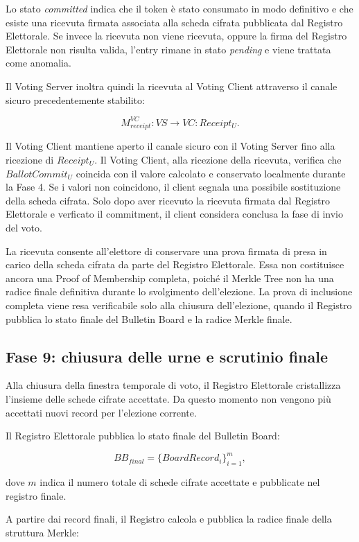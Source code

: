 \documentclass[a4paper,12pt]{article}
\begin{document}
Lo stato \emph{committed} indica che il token \`e stato consumato in modo definitivo e che esiste una ricevuta firmata associata alla scheda cifrata pubblicata dal Registro Elettorale.
Se invece la ricevuta non viene ricevuta, oppure la firma del Registro Elettorale non risulta valida, l'entry rimane in stato \emph{pending} e viene trattata come anomalia.

Il Voting Server inoltra quindi la ricevuta al Voting Client attraverso il canale sicuro precedentemente stabilito:

\[
	M_{receipt}^{VC} : VS \rightarrow VC :
	Receipt_U.
\]

Il Voting Client mantiene aperto il canale sicuro con il Voting Server fino alla ricezione di \(Receipt_U\).
Il Voting Client, alla ricezione della ricevuta, verifica che \(BallotCommit_U\) coincida con il valore calcolato e conservato localmente durante la Fase 4.
Se i valori non coincidono, il client segnala una possibile sostituzione della scheda cifrata.
Solo dopo aver ricevuto la ricevuta firmata dal Registro Elettorale e verficato il commitment, il client considera conclusa la fase di invio del voto.

La ricevuta consente all'elettore di conservare una prova firmata di presa in carico della scheda cifrata da parte del Registro Elettorale.
Essa non costituisce ancora una Proof of Membership completa, poich\'e il Merkle Tree non ha una radice finale definitiva durante lo svolgimento dell'elezione.
La prova di inclusione completa viene resa verificabile solo alla chiusura dell'elezione, quando il Registro pubblica lo stato finale del Bulletin Board e la radice Merkle finale.

\subsection{Fase 9: chiusura delle urne e scrutinio finale}

Alla chiusura della finestra temporale di voto, il Registro Elettorale cristallizza l'insieme delle schede cifrate accettate.
Da questo momento non vengono pi\`u accettati nuovi record per l'elezione corrente.

Il Registro Elettorale pubblica lo stato finale del Bulletin Board:

\[
	BB_{final} =
	\{BoardRecord_i\}_{i=1}^{m},
\]

dove \(m\) indica il numero totale di schede cifrate accettate e pubblicate nel registro finale.

A partire dai record finali, il Registro calcola e pubblica la radice finale della struttura Merkle:
\end{document}
